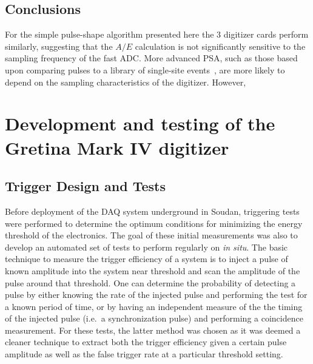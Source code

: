 		\subsection{Conclusions}
	     	\label{sec:HeadToHeadCompareConclusions}
		
	For the simple pulse-shape algorithm presented here the 3 digitizer cards perform similarly, suggesting that the $A/E$ calculation is not significantly sensitive to the sampling frequency of the fast ADC.  More advanced PSA, such as those based upon comparing pulses to a library of single-site events~\cite{Ren10}, are more likely to depend on the sampling characteristics of the digitizer.  However, 

	\section{Development and testing of the Gretina Mark IV digitizer}
		\subsection{Trigger Design and Tests}
		\label{sec:DeploymentPPC2SoudanTriggerDesign}     
			
	Before deployment of the DAQ system underground in Soudan, triggering tests were performed to determine the optimum conditions for minimizing the energy threshold of the electronics.  The goal of these initial measurements was also to develop an automated set of tests to perform regularly on  \emph{in situ}.  The basic technique to measure the trigger efficiency of a system is to inject a pulse of known amplitude into the system near threshold and scan the amplitude of the pulse around that threshold.  One can determine the probability of detecting a pulse by either knowing the rate of the injected pulse and performing the test for a known period of time, or by having an independent measure of the the timing of the injected pulse (i.e.~a synchronization pulse) and performing a coincidence measurement.  For these tests, the latter method was chosen as it was deemed a cleaner technique to extract both the trigger efficiency given a certain pulse amplitude as well as the false trigger rate at a particular threshold setting.  
	
